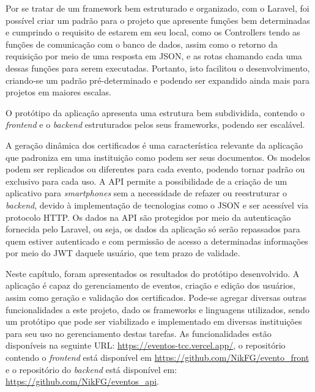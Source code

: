 Por se tratar de um framework bem estruturado e organizado, com o Laravel, foi possível criar um padrão para o projeto que apresente funções bem determinadas e cumprindo o requisito de estarem em seu local, como os Controllers tendo as funções de comunicação com o banco de dados, assim como o retorno da requisição por meio de uma resposta em JSON, e as rotas chamando cada uma dessas funções para serem executadas. Portanto, isto facilitou o desenvolvimento, criando-se um padrão pré-determinado e podendo ser expandido ainda mais para projetos em maiores escalas.

O protótipo da aplicação apresenta uma estrutura bem subdividida, contendo o \textit{frontend} e o \textit{backend} estruturados pelos seus frameworks, podendo ser escalável.

A geração dinâmica dos certificados é uma característica relevante da aplicação que padroniza em uma instituição como podem ser seus documentos. Os modelos podem ser replicados ou diferentes para cada evento, podendo tornar padrão ou exclusivo para cada uso. A API permite a possibilidade de a criação de um aplicativo para \textit{smartphones} sem a necessidade de refazer ou reestruturar o \textit{backend}, devido à implementação de tecnologias como o JSON e ser acessível via protocolo HTTP. Os dados na API são protegidos por meio da autenticação fornecida pelo Laravel, ou seja, os dados da aplicação só serão repassados para quem estiver autenticado e com permissão de acesso a determinadas informações por meio do JWT daquele usuário, que tem prazo de validade. 

Neste capítulo, foram apresentados os resultados do protótipo desenvolvido. A aplicação é capaz do gerenciamento de eventos, criação e edição dos usuários, assim como geração e validação dos certificados. Pode-se agregar diversas outras funcionalidades a este projeto, dado os frameworks e linguagens utilizados, sendo um protótipo que pode ser viabilizado e implementado em diversas instituições para seu uso no gerenciamento destas tarefas. As funcionalidades estão disponíveis na seguinte URL: \url{https://eventos-tcc.vercel.app/}, o repositório contendo o \textit{frontend} está disponível em \url{https://github.com/NikFG/evento_front} e o repositório do \textit{backend} está disponível em: \url{https://github.com/NikFG/eventos_api}.
